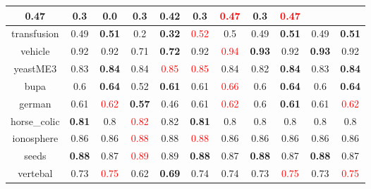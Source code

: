 \documentclass{article}%
\begin{document}
\begin{tabular}{c|cccccccccc}
{0.47
}&\textbf{0.3}&0.0&0.3&\textbf{0.42}&0.3&\textcolor{red}{ 
0.47
}&0.3&\textcolor{red}{ 
0.47
}\\%
\hline%
transfusion&0.49&\textbf{0.51}&0.2&\textbf{0.32}&\textcolor{red}{ 
0.52
}&0.5&0.49&\textbf{0.51}&0.49&\textbf{0.51}\\%
\hline%
vehicle&0.92&0.92&0.71&\textbf{0.72}&0.92&\textcolor{red}{ 
0.94
}&\textbf{0.93}&0.92&\textbf{0.93}&0.92\\%
\hline%
yeastME3&0.83&\textbf{0.84}&0.84&\textcolor{red}{ 
0.85
}&\textcolor{red}{ 
0.85
}&0.84&0.82&\textbf{0.84}&0.83&\textbf{0.84}\\%
\hline%
bupa&0.6&\textbf{0.64}&0.52&\textbf{0.61}&0.61&\textcolor{red}{ 
0.66
}&0.6&\textbf{0.64}&0.6&\textbf{0.64}\\%
\hline%
german&0.61&\textcolor{red}{ 
0.62
}&\textbf{0.57}&0.46&0.61&\textcolor{red}{ 
0.62
}&0.6&\textbf{0.61}&0.61&\textcolor{red}{ 
0.62
}\\%
\hline%
horse\_colic&\textbf{0.81}&0.8&\textcolor{red}{ 
0.82
}&0.82&\textbf{0.81}&0.8&0.8&0.8&0.8&0.8\\%
\hline%
ionosphere&0.86&0.86&\textcolor{red}{ 
0.88
}&0.88&\textcolor{red}{ 
0.88
}&0.86&0.86&0.86&0.86&0.86\\%
\hline%
seeds&\textbf{0.88}&0.87&\textcolor{red}{ 
0.89
}&0.89&\textbf{0.88}&0.87&\textbf{0.88}&0.87&\textbf{0.88}&0.87\\%
\hline%
vertebal&0.73&\textcolor{red}{ 
0.75
}&0.62&\textbf{0.69}&0.74&0.74&0.73&\textcolor{red}{ 
0.75
}&0.73&\textcolor{red}{ 
0.75
}\\%
\hline%
\end{tabular}

%
\end{document}
